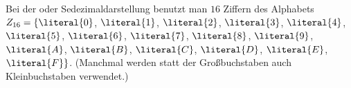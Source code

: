 
%
Bei der 
oder Sedezimaldarstellung benutzt man $16$ Ziffern des Alphabets
$Z_{16}=\{\literal{0}$, $\literal{1}$, $\literal{2}$, $\literal{3}$,
$\literal{4}$, $\literal{5}$, $\literal{6}$, $\literal{7}$,
$\literal{8}$, $\literal{9}$, $\literal{A}$, $\literal{B}$,
$\literal{C}$, $\literal{D}$, $\literal{E}$,
$\literal{F}\}$. (Manchmal werden statt der Großbuchstaben auch
Kleinbuchstaben verwendet.)

